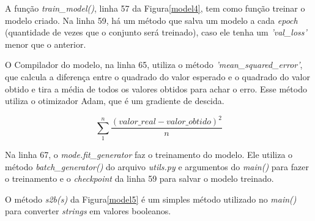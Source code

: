 A função \textit{train\_model()}, linha 57 da Figura\ref{model4}, tem como função treinar o modelo criado. Na linha 59, há um método que salva um modelo a cada \textit{epoch} (quantidade de vezes que o conjunto será treinado), caso ele tenha um \textit{'val\_loss'} menor que o anterior.

O Compilador do modelo, na linha 65, utiliza o método \textit{'mean\_squared\_error'}, que calcula a diferença entre o quadrado do valor esperado e o quadrado do valor obtido e tira a média de todos os valores obtidos para achar o erro. Esse método utiliza o otimizador Adam, que é um gradiente de descida.

\[\sum_{1}^{n}\frac{(valor\_real - valor\_obtido)^{2}}{n}\]

Na linha 67, o \textit{mode.fit\_generator} faz o treinamento do modelo. Ele utiliza o método \textit{batch\_generator()} do arquivo \textit{utils.py} e argumentos do \textit{main()} para fazer o treinamento e o \textit{checkpoint} da linha 59 para salvar o modelo treinado.

	\begin{figure}[H]
		\centering
\end{figure}

O método \textit{s2b(s)} da Figura\ref{model5} é um simples método utilizado no \textit{main()} para converter \textit{strings} em valores booleanos.

	\begin{figure}[H]
		\centering
\end{figure}


